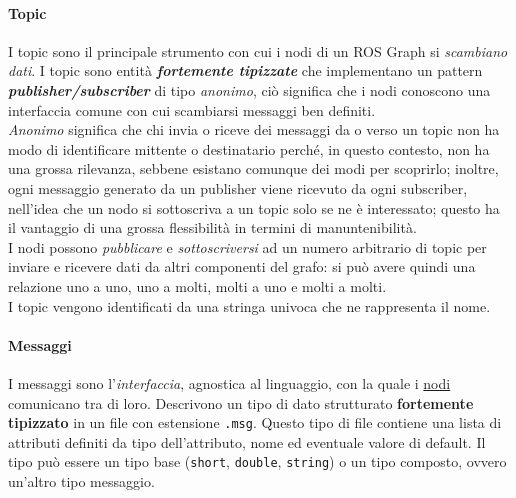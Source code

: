 \paragraph{Topic}
\label{ros:topics}
I topic sono il principale strumento con cui i nodi di un ROS Graph si \textit{scambiano dati}.
I topic sono entità \textbf{\textit{fortemente tipizzate}} che implementano
un pattern \textbf{\textit{publisher/subscriber}} di tipo \textit{anonimo}, ciò significa
che i nodi conoscono una interfaccia comune con cui scambiarsi messaggi ben definiti.\\
\textit{Anonimo} significa che chi invia o riceve dei messaggi da o verso un topic
non ha modo di identificare mittente o destinatario perché, in questo contesto, non ha una grossa rilevanza,
sebbene esistano comunque dei modi per scoprirlo; inoltre, ogni messaggio generato da un publisher
viene ricevuto da ogni subscriber, nell'idea che un nodo si sottoscriva a un topic solo se ne è
interessato; questo ha il vantaggio di una grossa flessibilità in termini di manuntenibilità.\\
I nodi possono \textit{pubblicare} e \textit{sottoscriversi} ad un numero arbitrario di topic
per inviare e ricevere dati da altri componenti del grafo: si può avere quindi una relazione uno a
uno, uno a molti, molti a uno e molti a molti.\\
I topic vengono identificati da una stringa univoca che ne rappresenta il nome.

\paragraph{Messaggi}
\label{ros:msgs}
I messaggi sono l'\textit{interfaccia}, agnostica al linguaggio, con la quale i \hyperref[ros:nodes]{nodi}
comunicano tra di loro. Descrivono un tipo di dato strutturato \textbf{fortemente tipizzato} in un
file con estensione \verb|.msg|. Questo tipo di file contiene una lista di attributi definiti da
tipo dell'attributo, nome ed eventuale valore di default. Il tipo può essere un tipo base
(\verb|short|, \verb|double|, \verb|string|) o un tipo composto, ovvero un'altro tipo messaggio.

